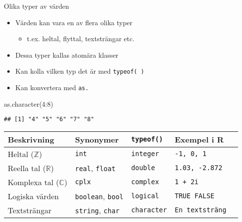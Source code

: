 \documentclass[
  10pt,
  ignorenonframetext,
]{beamer}
\newenvironment{Shaded}{\begin{snugshade}}{\end{snugshade}}
\newcommand{\DecValTok}[1]{\textcolor[rgb]{0.00,0.00,0.81}{#1}}
\newcommand{\FunctionTok}[1]{\textcolor[rgb]{0.00,0.00,0.00}{#1}}
\newcommand{\NormalTok}[1]{#1}
\newcommand{\SpecialCharTok}[1]{\textcolor[rgb]{0.00,0.00,0.00}{#1}}
\providecommand{\tightlist}{%
  \setlength{\itemsep}{0pt}\setlength{\parskip}{0pt}}
\begin{document}
\begin{frame}[fragile]{Olika typer av värden}
\protect\hypertarget{olika-typer-av-vuxe4rden}{}
\begin{itemize}
\tightlist
\item
  Värden kan vara en av flera olika typer

  \begin{itemize}
  \tightlist
  \item
    t.ex. heltal, flyttal, textsträngar etc.
  \end{itemize}
\item
  Dessa typer kallas atomära klasser
\item
  Kan kolla vilken typ det är med \texttt{typeof( )}
\item
  Kan konvertera med \texttt{as.}
\end{itemize}

\begin{Shaded}
\begin{Highlighting}[]
\FunctionTok{as.character}\NormalTok{(}\DecValTok{4}\SpecialCharTok{:}\DecValTok{8}\NormalTok{)}
\end{Highlighting}
\end{Shaded}

\begin{verbatim}
## [1] "4" "5" "6" "7" "8"
\end{verbatim}

\pause

\begin{longtable}[]{@{}lllll@{}}
\toprule
Beskrivning & Synonymer & \texttt{typeof()} & Exempel i R & \\
\midrule
\endhead
Heltal (\(\mathbb{Z}\)) & \texttt{int} & \texttt{integer} &
\texttt{-1,\ 0,\ 1} & \\
Reella tal (\(\mathbb{R}\)) & \texttt{real}, \texttt{float} &
\texttt{double} & \texttt{1.03,\ -2.872} & \\
Komplexa tal (\(\mathbb{C}\)) & \texttt{cplx} & \texttt{complex} &
\texttt{1\ +\ 2i} & \\
Logiska värden & \texttt{boolean}, \texttt{bool} & \texttt{logical} &
\texttt{TRUE\ FALSE} & \\
Textsträngar & \texttt{string}, \texttt{char} & \texttt{character} &
\texttt{En\ textsträng} & \\
\bottomrule
\end{longtable}
\end{frame}


\end{document}

